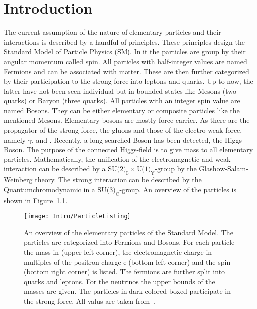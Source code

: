 \chapter{Introduction \label{sec:Intro}}

The current assumption of the nature of elementary particles and their interactions is described by a handful of principles. These principles design the Standard Model of Particle Physics (SM). In it the particles are group by their angular momentum called spin. All particles with half-integer values are named Fermions and can be associated with matter. These are then further categorized by their participation to the strong force into leptons and quarks. Up to now, the latter have not been seen individual but in bounded states like Mesons (two quarks) or Baryon (three quarks). All particles with an integer spin value are named Bosons. They can be either elementary or composite particles like the mentioned Mesons. Elementary bosons are mostly force carrier. As there are the propagator of the strong force, the gluons and those of the electro-weak-force, namely $\gamma{}$, \Zz{} and \Wpm{}. Recently, a long searched Boson has been detected, the Higgs-Boson. The purpose of the connected Higgs-field is to give mass to all elementary particles. Mathematically, the unification of the electromagnetic and weak interaction can be described by a $\textrm{SU(2)}_{\textrm{L}} \times \textrm{U(1)}_{\textrm{Y}}$-group by the Glashow-Salam-Weinberg theory. The strong interaction can be described by the Quantumchromodynamic in a $\textrm{SU(3)}_{\textrm{C}}$-group. An overview of the particles is shown in Figure~\ref{plot:IntroParticles}.

\begin{figure}[!htb]
  \centering
  \texttt{[image: Intro/ParticleListing]}
  \caption[Overview over the elementary particles]{An overview of the elementary particles of the Standard Model. The particles are categorized into Fermions and Bosons. For each particle the mass in \MeVcc (upper left corner), the electromagnetic charge in multiples of the positron charge e (bottom left corner) and the spin (bottom right corner) is listed. The fermions are further split into quarks and leptons. For the neutrinos the upper bounds of the masses are given. The particles in dark colored boxed participate in the strong force. All valus are taken from~. \label{plot:IntroParticles} }
\end{figure}

